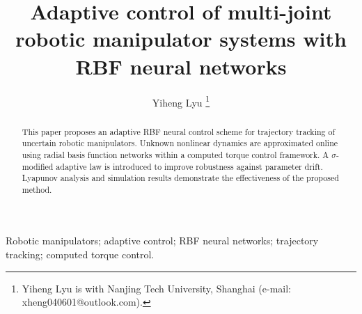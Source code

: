 \documentclass[journal]{IEEEtran}
\begin{document}
%
\title{Adaptive control of multi-joint robotic manipulator systems with RBF neural networks}
%
%
%

\author{Yiheng Lyu
	\thanks{Yiheng Lyu is with Nanjing Tech University, Shanghai (e-mail: xheng040601@outlook.com).}
}

%

\maketitle

\begin{abstract}
This paper proposes an adaptive RBF neural control scheme for trajectory tracking of uncertain robotic manipulators. Unknown nonlinear dynamics are approximated online using radial basis function networks within a computed torque control framework. A $\sigma$-modified adaptive law is introduced to improve robustness against parameter drift. Lyapunov analysis and simulation results demonstrate the effectiveness of the proposed method.
\end{abstract}

\begin{IEEEkeywords}
Robotic manipulators; adaptive control; RBF neural networks; trajectory tracking; computed torque control.
\end{IEEEkeywords}

\IEEEpeerreviewmaketitle










\appendices

\ifCLASSOPTIONcaptionsoff
  \newpage
\fi
\end{document}
